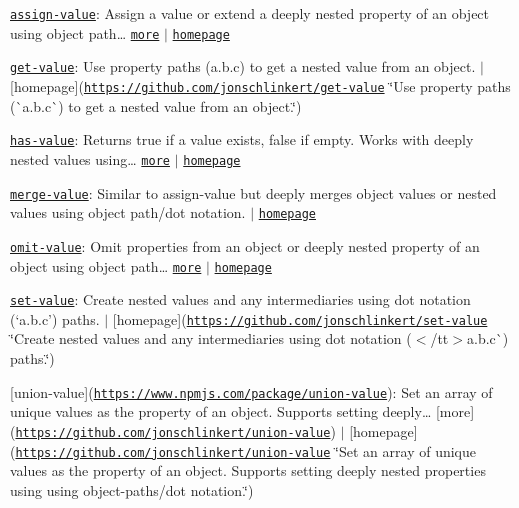 \begin{DoxyItemize}
\item \href{https://www.npmjs.com/package/assign-value}{\tt assign-\/value}\+: Assign a value or extend a deeply nested property of an object using object path… \href{https://github.com/jonschlinkert/assign-value}{\tt more} $\vert$ \href{https://github.com/jonschlinkert/assign-value}{\tt homepage}
\item \href{https://www.npmjs.com/package/get-value}{\tt get-\/value}\+: Use property paths ({\ttfamily a.\+b.\+c}) to get a nested value from an object. $\vert$ \mbox{[}homepage\mbox{]}(\href{https://github.com/jonschlinkert/get-value}{\tt https\+://github.\+com/jonschlinkert/get-\/value} \char`\"{}\+Use property paths (\`{}a.\+b.\+c\`{}) to get a nested value from an object.\char`\"{})
\item \href{https://www.npmjs.com/package/has-value}{\tt has-\/value}\+: Returns true if a value exists, false if empty. Works with deeply nested values using… \href{https://github.com/jonschlinkert/has-value}{\tt more} $\vert$ \href{https://github.com/jonschlinkert/has-value}{\tt homepage}
\item \href{https://www.npmjs.com/package/merge-value}{\tt merge-\/value}\+: Similar to assign-\/value but deeply merges object values or nested values using object path/dot notation. $\vert$ \href{https://github.com/jonschlinkert/merge-value}{\tt homepage}
\item \href{https://www.npmjs.com/package/omit-value}{\tt omit-\/value}\+: Omit properties from an object or deeply nested property of an object using object path… \href{https://github.com/jonschlinkert/omit-value}{\tt more} $\vert$ \href{https://github.com/jonschlinkert/omit-value}{\tt homepage}
\item \href{https://www.npmjs.com/package/set-value}{\tt set-\/value}\+: Create nested values and any intermediaries using dot notation (`\textquotesingle{}a.\+b.\+c'{\ttfamily ) paths. $\vert$ \mbox{[}homepage\mbox{]}(\href{https://github.com/jonschlinkert/set-value}{\tt https\+://github.\+com/jonschlinkert/set-\/value} \char`\"{}\+Create nested values and any intermediaries using dot notation ($<$/tt$>$\textquotesingle{}a.\+b.\+c\textquotesingle{}\`{}) paths.\char`\"{})}
\item {\ttfamily \mbox{[}union-\/value\mbox{]}(\href{https://www.npmjs.com/package/union-value}{\tt https\+://www.\+npmjs.\+com/package/union-\/value})\+: Set an array of unique values as the property of an object. Supports setting deeply… \mbox{[}more\mbox{]}(\href{https://github.com/jonschlinkert/union-value}{\tt https\+://github.\+com/jonschlinkert/union-\/value}) $\vert$ \mbox{[}homepage\mbox{]}(\href{https://github.com/jonschlinkert/union-value}{\tt https\+://github.\+com/jonschlinkert/union-\/value} \char`\"{}\+Set an array of unique values as the property of an object. Supports setting deeply nested properties using using object-\/paths/dot notation.\char`\"{})}

\end{DoxyItemize}
